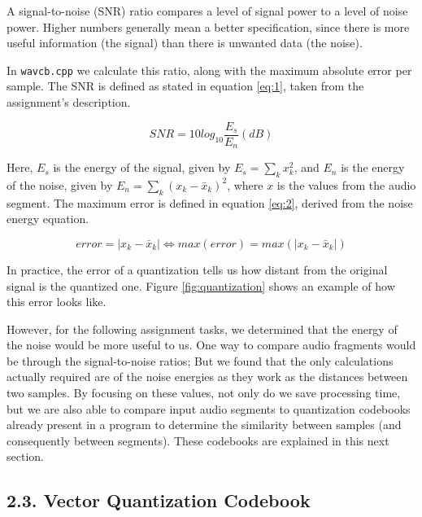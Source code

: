 \documentclass[12pt]{article}
\begin{document}
A signal-to-noise (SNR) ratio compares a level of signal power to a level of 
noise power. 
Higher numbers generally mean a better specification, since there is more useful 
information (the signal) than there is unwanted data (the noise).

In \texttt{wavcb.cpp} we calculate this ratio, along with the maximum absolute 
error per sample. The SNR is defined as stated in equation \ref{eq:1}, taken 
from the assignment's description.

\begin{equation} \label{eq:1}
  SNR = 10 log_{10} \frac{E_{s}}{E_{n}} (dB)
\end{equation}

Here, $E_s$ is the energy of the signal, given by $E_s = \sum_{k} x_k^2$, and
$E_n$ is the energy of the noise, given by $E_n = \sum_{k} (x_k-\bar{x}_k)^2$,
where $x$ is the values from the audio segment.
The maximum error is defined in equation \ref{eq:2}, derived from the noise 
energy equation.

\begin{equation} \label{eq:2}
  error = |x_k-\bar{x}_k| \Leftrightarrow 
  max(error) = max(|x_k-\bar{x}_k|)
\end{equation}

In practice, the error of a quantization tells us how distant from the original
signal is the quantized one.
Figure \ref{fig:quantization} shows an example of how this error looks like.

However, for the following assignment tasks, we determined that the energy of
the noise would be more useful to us.
One way to compare audio fragments would be through the signal-to-noise ratios;
But we found that the only calculations actually required are of the noise 
energies as they work as the distances between two samples.
By focusing on these values, not only do we save processing time, but we are
also able to compare input audio segments to quantization codebooks already 
present in a program to determine the similarity between samples (and 
consequently between segments). These codebooks are explained in this next section.

\subsection*{2.3. Vector Quantization Codebook}
\label{sec:vctQuantCB}
\end{document}
